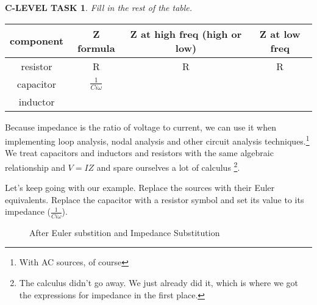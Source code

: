 \documentclass{book}
\numberwithin{equation}{section}
\newtheorem{clevel}{C-LEVEL TASK}
\theoremstyle{definition}
\begin{document}
\begin{clevel}
Fill in the rest of the table.
\end{clevel}

\begin{table}[H]
\begin{tabular}{|c|c|c|c|} \hline
component&Z formula&Z at high freq (high or low)& Z at low freq\\ \hline
resistor&R&R&R \\ \hline
capacitor&$\frac{1}{Ci\omega}$&& \\ \hline
inductor&&&  \\ \hline
\end{tabular}
\end{table}

Because impedance is the ratio of voltage to current, we can use it when implementing loop analysis, nodal analysis and other circuit analysis techniques.\footnote{With AC sources, of course} We treat capacitors and inductors and resistors with the same algebraic relationship and $V=IZ$ and spare ourselves a lot of calculus \footnote{The calculus didn't go away. We just already did it, which is where we got the expressions for impedance in the first place.}.\par

Let's keep going with our example. Replace the sources with their Euler equivalents. Replace the capacitor with a resistor symbol and set its value to its impedance ($\frac{1}{Ci\omega}$).

\par
\begin{figure}[H]
\begin{center}
\caption{After Euler substition and Impedance Substitution}
\label{F:8SI2}
\end{center}
\end{figure}
\end{document}
